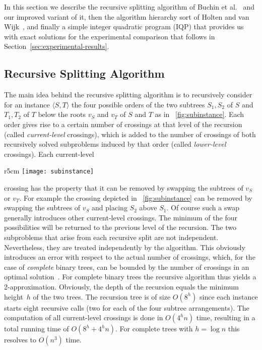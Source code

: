 \documentclass[runningheads,a4paper]{llncs}
\newcommand{\ttree}[1]{\ensuremath{\langle #1 \rangle}}
\begin{document}
In this section we describe the recursive splitting algorithm of
Buchin et al.~\cite{bbbnow-dbtha-08} and our improved variant of it,
then the algorithm hierarchy sort of Holten and van
Wijk~\cite{hw-vchod-08}, and finally a simple integer quadratic
program (IQP) that provides us with exact solutions for the
experimental comparison that follows in
Section~\ref{sec:experimental-results}.

\subsection{Recursive Splitting Algorithm}\label{sec:recurs-splitt-algo}

The main idea behind the recursive splitting algorithm is to
recursively consider for an instance \ttree{S,T} the four possible
orders of the two subtrees $S_1,S_2$ of $S$ and
$T_1,T_2$ of $T$ below the roots $v_S$ and $v_T$ of $S$ and $T$ as in
\figurename~\ref{fig:subinstance}.  Each order gives rise to a certain
number of crossings at that level of the recursion (called
\emph{current-level} crossings), which is added to the number of
crossings of both recursively solved subproblems induced by that order
(called \emph{lower-level} crossings). 
Each current-level 
\begin{wrapfigure}[11]{r}{5cm}
  \centering
  \vspace*{-4.5ex}
  \texttt{[image: subinstance]}
\caption{A subinstance \ttree{S,T} with a current-level crossing.}
  \label{fig:subinstance}
\end{wrapfigure} 
crossing has
the property that it can be removed by swapping the subtrees of $v_S$
or $v_T$. For example the crossing depicted in
\figurename~\ref{fig:subinstance} can be removed by swapping the
subtrees of $v_S$ and placing $S_2$ above $S_1$. Of course such a swap
generally introduces other current-level crossings. The minimum of the
four possibilities will be returned to the previous level of the
recursion. The two subproblems that arise from each recursive split
are not independent.  Nevertheless, they are treated independently by
the algorithm. This obviously introduces an error with respect to the actual
number of crossings, which, for the case of \emph{complete} binary
trees, can be bounded by the number of crossings in an optimal
solution~\cite{bbbnow-dbtha-08}.  For complete binary trees the
recursive algorithm thus yields a 2-approximation.  Obviously, the
depth of the recursion equals the minimum height~$h$ of the two
trees. The recursion tree is of size $O(8^h)$ since each instance
starts eight recursive calls (two for each of the four subtree
arrangements). The computation of all current-level crossings is done in $O(4^h n)$
time, resulting in a total running time of $O(8^h + 4^h n)$.
For
complete trees with $h = \log n$ this resolves to $O(n^3)$ time.
\end{document}
